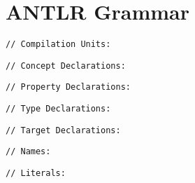 \clearpage
\section{ANTLR Grammar}

\begin{framed}
\verbatimfont{\small}
\begin{verbatim}
// Compilation Units:
\end{verbatim}

\begin{verbatim}
// Concept Declarations:
\end{verbatim}

\begin{verbatim}
// Property Declarations:
\end{verbatim}

\begin{verbatim}
// Type Declarations:
\end{verbatim}

\begin{verbatim}
// Target Declarations:
\end{verbatim}

\begin{verbatim}
// Names:
\end{verbatim}

\begin{verbatim}
// Literals:
\end{verbatim}


\end{framed}
